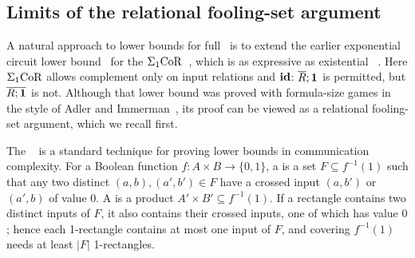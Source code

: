 \subsection{Limits of the relational fooling-set argument}\label{sec:natural-approaches}
A natural approach to lower bounds for full \CoR\ is to extend the earlier
exponential circuit lower bound~\citep[Theorems~6.1 and~6.12]{nakamura2022}
for the  $\Sigma_1\mathrm{CoR}$~\citep{nakamura2022,nakamura2023}, which is as expressive as existential \FOthree~\citep[Corollary~3.14]{nakamura2022}.
Here $\Sigma_1\mathrm{CoR}$ allows complement only on input relations and $\mathbf{id}$:
$\overline R;\mathbf{1}$ is permitted, but $\overline{R;\mathbf{1}}$ is not.
Although that lower bound was proved with formula-size games in the
style of Adler and Immerman~\citep{adler-immerman2003}, its proof can be
viewed as a relational fooling-set argument, which we recall first.

The ~\citep{yao1979,lipton-sedgewick1981,kushilevitz-nisan1997,rao-yehudayoff2020}
is a standard technique for proving lower bounds in communication complexity.
For a Boolean function $f\colon A\times B\to\{0,1\}$, a
 is a set $F\subseteq f^{-1}(1)$ such that any two
distinct $(a,b),(a',b')\in F$ have a crossed input $(a,b')$ or
$(a',b)$ of value $0$. A  is a product
$A'\times B'\subseteq f^{-1}(1)$. If a rectangle contains two distinct inputs of $F$,
it also contains their crossed inputs, one of which has value $0$; hence each
1\nobreakdash-rectangle contains at most one input of $F$, and covering
$f^{-1}(1)$ needs at least $|F|$ 1\nobreakdash-rectangles.

